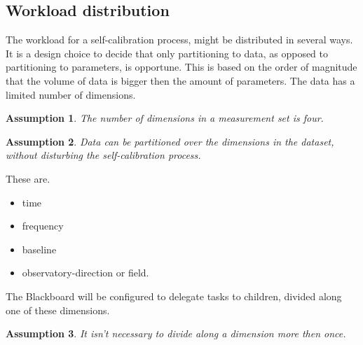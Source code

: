 \documentclass[]{lofar}
\newtheorem{assumption}{Assumption}[section]
\begin{document}
    \subsection{Workload distribution}
    \label{subsec:workload-distribution}\hypertarget{subsec:workload-distribution}{}%

      The workload for a self-calibration process, might be
      distributed in several ways. It is a design choice to decide
      that only partitioning to data, as opposed to partitioning to
      parameters, is opportune. This is based on the order of
      magnitude that the volume of data is bigger then the amount of
      parameters. The data has a limited number of dimensions.

      \begin{assumption}
        The number of dimensions in a measurement set is four.
        \label{ass:dimensions}
      \end{assumption}

      \begin{assumption}
        Data can be partitioned over the dimensions in the dataset,
        without disturbing the self-calibration process.
        \label{ass:partitioning}
      \end{assumption}

      These are.

      \begin{itemize}

        \item 

          time

	\item 

          frequency

	\item 

          baseline

	\item 

          observatory-direction or field.

      \end{itemize}

      The Blackboard will be configured to delegate tasks to children,
      divided along one of these dimensions.

      \begin{assumption}
        It isn't necessary to divide along a dimension more then once.
        \label{ass:devision}
      \end{assumption}
\end{document}
